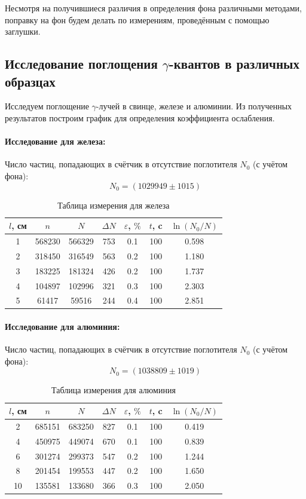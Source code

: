 \documentclass[12pt]{article}
\begin{document}
\par
	Несмотря на получившиеся различия в определения фона различными методами, поправку на фон будем делать по измерениям, проведённым с помощью заглушки.

\subsection*{Исследование поглощения $\gamma$-квантов в различных образцах}
\par
	Исследуем поглощение $\gamma$-лучей в свинце, железе и алюминии. Из полученных результатов построим график для определения коэффициента ослабления.

\paragraph*{Исследование для железа: }
\par
	Число частиц, попадающих в счётчик в отсутствие поглотителя $N_0$ (с учётом фона):
\[
	N_0 = \left(1029949 \pm 1015\right)
\]
\begin{table}[h!]
	\centering
	\begin{tabular}{|c|c|c|c|c|c|c|}
	\hline
		$l$, см & $n$ & $N$ & $\Delta N$ & $\varepsilon$, $\%$ & $t$, c & $\ln(N_0 / N)$  \\
	\hline
		1 &	568230 & 566329 & 753 &	0.1	& 100 & 0.598 \\
	\hline
		2 & 318450 & 316549 & 563 & 0.2	& 100 & 1.180 \\
	\hline
		3 & 183225 & 181324	& 426 & 0.2 & 100 & 1.737 \\
	\hline	
		4 & 104897 & 102996	& 321 & 0.3	& 100 & 2.303 \\
	\hline	
		5 & 61417 &	59516 &	244 & 0.4 &	100 & 2.851 \\
	\hline
	\end{tabular}
	\caption{Таблица измерения для железа}
\end{table}
	
\paragraph*{Исследование для алюминия: }
\par
	Число частиц, попадающих в счётчик в отсутствие поглотителя $N_0$ (с учётом фона):
\[
	N_0 = \left(1038809 \pm 1019\right)
\]
\begin{table}[h!]
	\centering
	\begin{tabular}{|c|c|c|c|c|c|c|}
	\hline
		$l$, см & $n$ & $N$ & $\Delta N$ & $\varepsilon$, $\%$ & $t$, c & $\ln(N_0 / N)$  \\
	\hline
	2 &	685151	&683250&	827	&0.1& 100 &	0.419 \\
	\hline	
	4	&450975	&449074	&670	&0.1&	100 &0.839 \\
	\hline	
	6	&301274	&299373	&547	&0.2&	100&1.244 \\
	\hline	
	8	&201454&	199553&	447	&0.2&	100 & 1.650 \\
	\hline
10	&135581&	133680	&366	&0.3&	100 & 2.050 \\
	\hline
	\end{tabular}
	\caption{Таблица измерения для алюминия}
\end{table}
\end{document}
